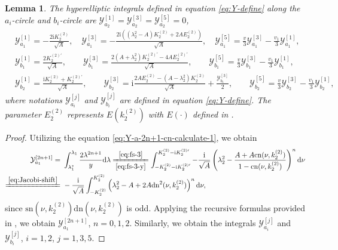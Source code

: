 \documentclass[11pt,reqno]{amsart}
\newcommand{\ii}{\mathrm{i}}
\newcommand{\sn}{\mathrm{sn}}
\newcommand{\cn}{\mathrm{cn}}
\newcommand{\dn}{\mathrm{dn}}
\newcommand{\dd}{\mathrm{d}}
\newtheorem{lemma}{Lemma}
\numberwithin{equation}{section}
\begin{document}
\begin{lemma}\label{lemma:cn-2-int}
	The hyperelliptic integrals defined in equation \eqref{eq:Y-define} along the $a_i$-circle and $b_i$-circle are $	\mathcal{Y}_{a_2}^{[1]}=\mathcal{Y}_{a_2}^{[3]}=\mathcal{Y}_{a_2}^{[5]}=0$,
	\begin{equation}\nonumber
		\begin{split}
			&\mathcal{Y}_{a_1}^{[1]} =-\frac{2\ii   K^{(2)}_2}{\sqrt{A}}, \quad  
			\mathcal{Y}_{a_1}^{[3]} =-\frac{2\ii \left((\lambda_2^2-A)  K^{(2)}_2+2 A  E^{(2)}_2\right)}{\sqrt{A}},\quad
			\mathcal{Y}_{a_1}^{[5]} = \frac{v}{3}\mathcal{Y}_{a_1}^{[3]}- \frac{v_1}{3}\mathcal{Y}_{a_1}^{[1]},\\
			&\mathcal{Y}_{b_1}^{[1]}=\frac{2  K^{(2)\prime}_2}{\sqrt{A}}, \qquad	
			\mathcal{Y}_{b_1}^{[3]}=\frac{2(A+\lambda_2^2)  K^{(2)\prime}_2-4A E^{(2)\prime}_2}{\sqrt{A}}, \qquad 
			\mathcal{Y}_{b_1}^{[5]}=\frac{v}{3}\mathcal{Y}_{b_1}^{[3]}-\frac{v_1}{3}\mathcal{Y}_{b_1}^{[1]}, \\
			&\mathcal{Y}_{b_2}^{[1]}=\frac{\ii   K^{(2)}_2+  K^{(2)\prime}_2}{\sqrt{A}}, \qquad
			\mathcal{Y}_{b_2}^{[3]}=\ii\frac{2A  E^{(2)}_2-(A-\lambda_2^2)  K^{(2)}_2}{\sqrt{A}}+\frac{\mathcal{Y}_{b_1}^{[3]}}{2},\qquad \mathcal{Y}_{b_2}^{[5]}=\frac{v}{3}\mathcal{Y}_{b_2}^{[3]}-\frac{v_1}{3}\mathcal{Y}_{b_2}^{[1]},
		\end{split}
	\end{equation}
	where notations $\mathcal{Y}_{a_i}^{[j]}$ and $\mathcal{Y}_{b_i}^{[j]}$ are defined in equation \eqref{eq:Y-define}.
	The parameter $E_2^{(2)}$ represents $E(k_2^{(2)})$ with $E(\cdot)$ defined in .
\end{lemma}

\begin{proof}
	Utilizing the equation \eqref{eq:Y-a-2n+1-cn-calculate-1}, we obtain
	\begin{equation}
		\begin{split}
			\mathcal{Y}_{a_1}^{[2n+1]}=&\ \int_{\lambda_1^*}^{\lambda_1}\frac{2\lambda^{2n+1}}{y}\dd \lambda
			\xlongequal[\eqref{eq:fs-3-y}]{\eqref{eq:fs-3}} \int_{-  K^{(2)}_2-\ii   K^{(2)\prime}_2}^{  K^{(2)}_2-\ii   K^{(2)\prime}_2}-\frac{\ii}{\sqrt{A}} \left(\lambda_2^2-\frac{A+A\cn(\nu,  k^{(2)}_2)}{1-\cn(\nu, k^{(2)}_2)}\right)^n \dd \nu\\
			\xlongequal{\eqref{eq:Jacobi-shift}}&\ -\frac{\ii}{\sqrt{A}}\int_{-  K^{(2)}_2}^{  K^{(2)}_2}\left(\lambda_2^2 -A + 2A\dn^2(\nu,  k^{(2)}_2)\right)^n \dd \nu,
		\end{split}
	\end{equation}
	since $\sn(\nu,  k^{(2)}_2)\dn(\nu,  k^{(2)}_2)$ is odd.
	Applying the recursive formulas provided in , we obtain $\mathcal{Y}_{a_1}^{[2n+1]}$, $n=0,1,2$.
	Similarly, we obtain the integrals $\mathcal{Y}_{a_i}^{[j]}$ and $\mathcal{Y}_{b_i}^{[j]}$, $i=1,2$, $j=1,3,5$.
\end{proof}
	
\end{document}
